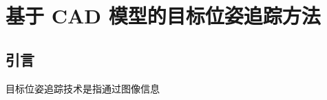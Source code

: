 \chapter{基于 CAD 模型的目标位姿追踪方法}
\label{cha:model_based_tracking}
\section{引言}
\label{sec:chapter3_intro}
目标位姿追踪技术是指通过图像信息